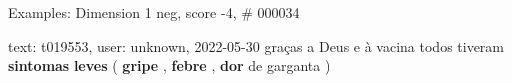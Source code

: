 \begin{frame}{Examples: Dimension 1 neg, score -4, \# 000034}
\footnotesize
\begin{alertblock}{text: t019553, user: unknown, 2022-05-30}
graças a Deus e à vacina todos tiveram \textbf{sintomas} \textbf{leves} ( 
\textbf{gripe} , \textbf{febre} , \textbf{dor} de garganta ) 
\end{alertblock}
\end{frame}
